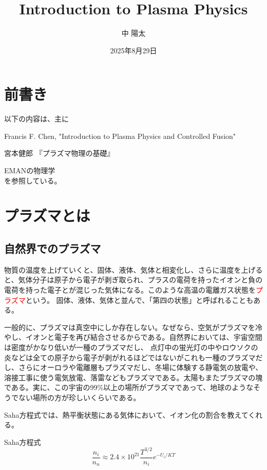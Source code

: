 \documentclass{ltjsarticle}
\title{Introduction to Plasma Physics}
\author{中 陽太}
\date{2025年8月29日}
\numberwithin{equation}{section} %
\begin{document}
\maketitle

\tableofcontents

\section*{前書き}
 以下の内容は、主に

\cite{a} Francis F. Chen, "Introduction to Plasma Physics and Controlled Fusion"\par
\cite{b} 宮本健郎 『プラズマ物理の基礎』\par
\cite{c} EMANの物理学\\
を参照している。





\section{プラズマとは} \label{section1}
\subsection{自然界でのプラズマ}
 物質の温度を上げていくと、固体、液体、気体と相変化し、さらに温度を上げると、気体分子は原子から電子が剥ぎ取られ、プラスの電荷を持ったイオンと負の電荷を持った電子とが混じった気体になる。このような高温の電離ガス状態を\textcolor{red}{プラズマ}という。
固体、液体、気体と並んで、「第四の状態」と呼ばれることもある。

 一般的に、プラズマは真空中にしか存在しない。なぜなら、空気がプラズマを冷やし、イオンと電子を再び結合させるからである。自然界においては、宇宙空間は密度がかなり低いが一種のプラズマだし、
点灯中の蛍光灯の中やロウソクの炎などは全ての原子から電子が剥がれるほどではないがこれも一種のプラズマだし、さらにオーロラや電離層もプラズマだし、冬場に体験する静電気の放電や、溶接工事に使う電気放電、落雷などもプラズマである。太陽もまたプラズマの塊である。実に、この宇宙の99\%以上の場所がプラズマであって、地球のようなそうでない場所の方が珍しいくらいである。

 Saha方程式では、熱平衡状態にある気体において、イオン化の割合を教えてくれる。

\begin{eqbox}{Saha方程式}
\begin{equation}
\frac{n_i}{n_n} \approx 2.4 \times 10^{21} \frac{T^{3/2}}{n_i} e^{-U_i/KT} 
\end{equation}  
\end{eqbox}
\end{document}
